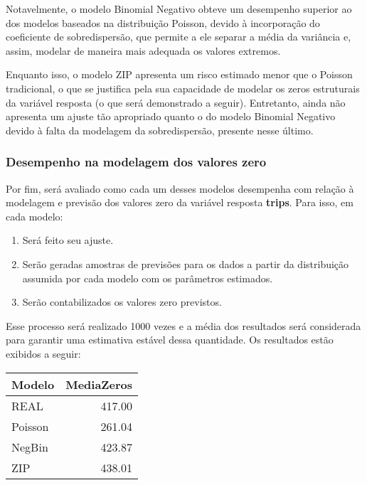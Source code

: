 \documentclass[
  twocolumn]{article}
\providecommand{\tightlist}{%
  \setlength{\itemsep}{0pt}\setlength{\parskip}{0pt}}
\begin{document}
Notavelmente, o modelo Binomial Negativo obteve um desempenho superior
ao dos modelos baseados na distribuição Poisson, devido à incorporação
do coeficiente de sobredispersão, que permite a ele separar a média da
variância e, assim, modelar de maneira mais adequada os valores
extremos.

Enquanto isso, o modelo ZIP apresenta um risco estimado menor que o
Poisson tradicional, o que se justifica pela sua capacidade de modelar
os zeros estruturais da variável resposta (o que será demonstrado a
seguir). Entretanto, ainda não apresenta um ajuste tão apropriado quanto
o do modelo Binomial Negativo devido à falta da modelagem da
sobredispersão, presente nesse último.

\subsubsection{Desempenho na modelagem dos valores
zero}\label{desempenho-na-modelagem-dos-valores-zero}

Por fim, será avaliado como cada um desses modelos desempenha com
relação à modelagem e previsão dos valores zero da variável resposta
\textbf{trips}. Para isso, em cada modelo:

\begin{enumerate}
\def\labelenumi{\arabic{enumi}.}
\tightlist
\item
  Será feito seu ajuste.
\item
  Serão geradas amostras de previsões para os dados a partir da
  distribuição assumida por cada modelo com os parâmetros estimados.
\item
  Serão contabilizados os valores zero previstos.
\end{enumerate}

Esse processo será realizado 1000 vezes e a média dos resultados será
considerada para garantir uma estimativa estável dessa quantidade. Os
resultados estão exibidos a seguir:

\begin{center}
\begin{tabular}{lr}
  \hline
Modelo & MediaZeros \\ 
  \hline
REAL & 417.00 \\ 
  Poisson & 261.04 \\ 
  NegBin & 423.87 \\ 
  ZIP & 438.01 \\ 
   \hline
\end{tabular}
\end{center}
\end{document}
